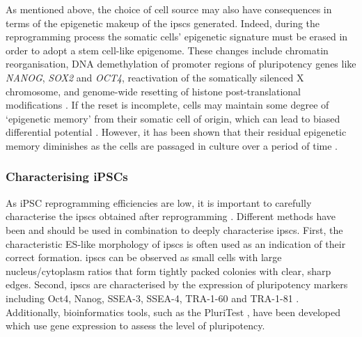 As mentioned above, the choice of cell source may also have consequences in terms of the epigenetic makeup of the \glspl{ipsc} generated.
Indeed, during the reprogramming process the somatic cells' epigenetic signature must be erased in order to adopt a stem cell-like epigenome.
These changes include chromatin reorganisation, DNA demethylation of promoter regions of pluripotency genes like \textit{NANOG}, \textit{SOX2} and \textit{OCT4}, reactivation of the somatically silenced X chromosome, and genome-wide resetting of histone post-translational modifications \cite{takahashi2007induction, maherali2007directly, wernig2007vitro, buganim2013mechanisms}.
If the reset is incomplete, cells may maintain some degree of `epigenetic memory' from their somatic cell of origin, which can lead to biased differential potential \cite{kim2010epigenetic, polo2010cell}.
However, it has been shown that their residual epigenetic memory diminishes as the cells are passaged in culture over a period of time \cite{ghosh2010persistent}.

\subsubsection{Characterising iPSCs}
\label{sec:ipsc_characterise}

As iPSC reprogramming efficiencies are low, it is important to carefully characterise the \glspl{ipsc} obtained after reprogramming \cite{brouwer2016choices}.
Different methods have been and should be used in combination to deeply characterise \glspl{ipsc}. 
First, the characteristic ES-like morphology of \glspl{ipsc} is often used as an indication of their correct formation. 
\glspl{ipsc} can be observed as small cells with large nucleus/cytoplasm ratios that form tightly packed colonies with clear, sharp edges. 
Second, \glspl{ipsc} are characterised by the expression of pluripotency markers including Oct4, Nanog, SSEA-3, SSEA-4, TRA-1-60 and TRA-1-81 \cite{boulting2011functionally}.
Additionally, bioinformatics tools, such as the PluriTest \cite{muller2011bioinformatic}, have been developed which use gene expression to assess the level of pluripotency. \\

